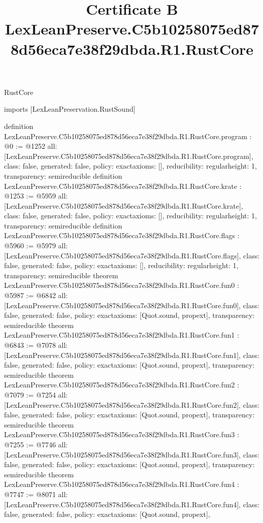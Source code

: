 \begin{lexlean}{RustCore}
\title{Certificate B LexLeanPreserve.C5b10258075ed878d56eca7e38f29dbda.R1.RustCore}
\begin{coremodule}
imports [LexLeanPreservation.RustSound]

definition LexLeanPreserve.C5b10258075ed878d56eca7e38f29dbda.R1.RustCore.program : @0 := @1252 {
  all: [LexLeanPreserve.C5b10258075ed878d56eca7e38f29dbda.R1.RustCore.program],
  class: false,
  generated: false,
  policy: exact{axioms: []},
  reducibility: regular{height: 1},
  transparency: semireducible
}
definition LexLeanPreserve.C5b10258075ed878d56eca7e38f29dbda.R1.RustCore.krate : @1253 := @5959 {
  all: [LexLeanPreserve.C5b10258075ed878d56eca7e38f29dbda.R1.RustCore.krate],
  class: false,
  generated: false,
  policy: exact{axioms: []},
  reducibility: regular{height: 1},
  transparency: semireducible
}
definition LexLeanPreserve.C5b10258075ed878d56eca7e38f29dbda.R1.RustCore.flags : @5960 := @5979 {
  all: [LexLeanPreserve.C5b10258075ed878d56eca7e38f29dbda.R1.RustCore.flags],
  class: false,
  generated: false,
  policy: exact{axioms: []},
  reducibility: regular{height: 1},
  transparency: semireducible
}
theorem LexLeanPreserve.C5b10258075ed878d56eca7e38f29dbda.R1.RustCore.fun0 : @5987 := @6842 {
  all: [LexLeanPreserve.C5b10258075ed878d56eca7e38f29dbda.R1.RustCore.fun0],
  class: false,
  generated: false,
  policy: exact{axioms: [Quot.sound, propext]},
  transparency: semireducible
}
theorem LexLeanPreserve.C5b10258075ed878d56eca7e38f29dbda.R1.RustCore.fun1 : @6843 := @7078 {
  all: [LexLeanPreserve.C5b10258075ed878d56eca7e38f29dbda.R1.RustCore.fun1],
  class: false,
  generated: false,
  policy: exact{axioms: [Quot.sound, propext]},
  transparency: semireducible
}
theorem LexLeanPreserve.C5b10258075ed878d56eca7e38f29dbda.R1.RustCore.fun2 : @7079 := @7254 {
  all: [LexLeanPreserve.C5b10258075ed878d56eca7e38f29dbda.R1.RustCore.fun2],
  class: false,
  generated: false,
  policy: exact{axioms: [Quot.sound, propext]},
  transparency: semireducible
}
theorem LexLeanPreserve.C5b10258075ed878d56eca7e38f29dbda.R1.RustCore.fun3 : @7255 := @7746 {
  all: [LexLeanPreserve.C5b10258075ed878d56eca7e38f29dbda.R1.RustCore.fun3],
  class: false,
  generated: false,
  policy: exact{axioms: [Quot.sound, propext]},
  transparency: semireducible
}
theorem LexLeanPreserve.C5b10258075ed878d56eca7e38f29dbda.R1.RustCore.fun4 : @7747 := @8071 {
  all: [LexLeanPreserve.C5b10258075ed878d56eca7e38f29dbda.R1.RustCore.fun4],
  class: false,
  generated: false,
  policy: exact{axioms: [Quot.sound, propext]},
}
\end{coremodule}
\end{lexlean}

